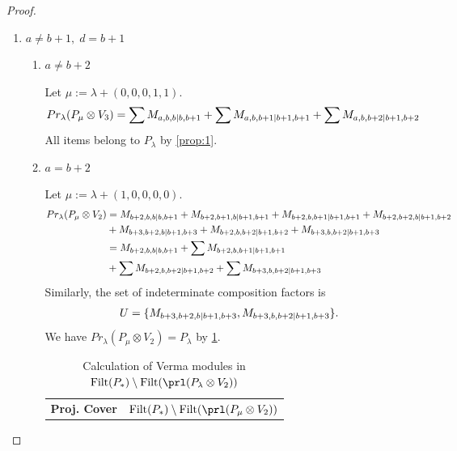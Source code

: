 \begin{proof}
\begin{enumerate}
\begin{enumerate}
      \item $a \neq b+1 ,\; d = b+1$
        \begin{enumerate}
          \item $ a \neq b+2 $ \par
        Let $\mu:=\lambda + (0,0,0,1,1) $.
        \begin{equation}\notag
          \begin{aligned}
            Pr_{\lambda}(P_\mu \otimes V_{3}) &=
\sum M_{a,b,b|b,b+1}
+ \sum M_{a,b,b+1|b+1,b+1}
+ \sum M_{a,b,b+2|b+1,b+2}
          \end{aligned}
        \end{equation}
All items belong to $P_\lambda$ by \cref{prop:1}.

          \item $ a = b+2 $ \par
        Let $\mu:=\lambda + (1,0,0,0,0) $.
        \begin{equation}\notag
          \begin{aligned}
            Pr_{\lambda}(P_\mu \otimes V_{2}) &=
M_{b+2,b,b|b,b+1}
+ M_{b+2,b+1,b|b+1,b+1}
+ M_{b+2,b,b+1|b+1,b+1}
+ M_{b+2,b+2,b|b+1,b+2}\\
                                               &
+ M_{b+3,b+2,b|b+1,b+3}
+ M_{b+2,b,b+2|b+1,b+2}
+ M_{b+3,b,b+2|b+1,b+3} \\
                                               &=
 M_{b+2,b,b|b,b+1}
+ \sum M_{b+2,b,b+1|b+1,b+1}\\
                                               &
+ \sum M_{b+2,b,b+2|b+1,b+2}
+ \sum M_{b+3,b,b+2|b+1,b+3}
          \end{aligned}
        \end{equation}
      Similarly, the set of indeterminate composition factors is 
\begin{equation}\notag
  \begin{aligned}
    U = \{
M_{b+3,b+2,b|b+1,b+3},
M_{b+3,b,b+2|b+1,b+3}
\}.
  \end{aligned}
\end{equation}
       We have $Pr_{\lambda}(P_\mu \otimes V_{2}) = P_\lambda  $ by \cref{tab:verma-analysis_1_a_20}.
\begin{table}[htbp]
\centering
\caption{Calculation of Verma modules in $\operatorname{Filt}(P_*) \setminus \operatorname{Filt}(\prl(P_\lambda \otimes V_{2})) $ } \label{tab:verma-analysis_1_a_20}
\begin{tabular}{cc}
\toprule
\textbf{Proj. Cover} & \textbf{$\operatorname{Filt}(P_*) \setminus \operatorname{Filt}(\prl(P_\mu \otimes V_{2})) $}  \\

\end{tabular}
\end{table}
\end{enumerate}
\end{enumerate}
\end{enumerate}
\end{proof}
